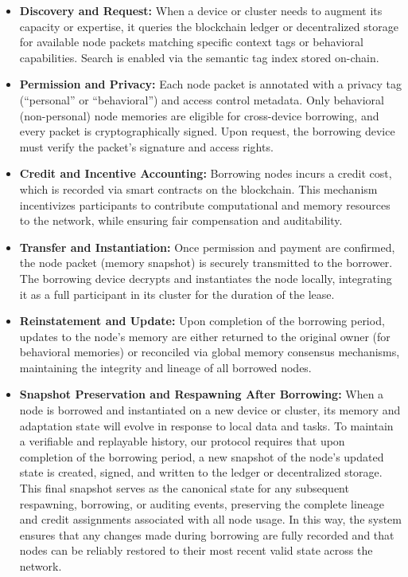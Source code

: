 \documentclass[11pt]{article}
\begin{document}
\begin{itemize}
    \item \textbf{Discovery and Request:} When a device or cluster needs to augment its capacity or expertise, it queries the blockchain ledger or decentralized storage for available node packets matching specific context tags or behavioral capabilities. Search is enabled via the semantic tag index stored on-chain.
    
    \item \textbf{Permission and Privacy:} Each node packet is annotated with a privacy tag (“personal” or “behavioral”) and access control metadata. Only behavioral (non-personal) node memories are eligible for cross-device borrowing, and every packet is cryptographically signed. Upon request, the borrowing device must verify the packet’s signature and access rights.
    
    \item \textbf{Credit and Incentive Accounting:} Borrowing nodes incurs a credit cost, which is recorded via smart contracts on the blockchain. This mechanism incentivizes participants to contribute computational and memory resources to the network, while ensuring fair compensation and auditability.
    
    \item \textbf{Transfer and Instantiation:} Once permission and payment are confirmed, the node packet (memory snapshot) is securely transmitted to the borrower. The borrowing device decrypts and instantiates the node locally, integrating it as a full participant in its cluster for the duration of the lease.
    
    \item \textbf{Reinstatement and Update:} Upon completion of the borrowing period, updates to the node’s memory are either returned to the original owner (for behavioral memories) or reconciled via global memory consensus mechanisms, maintaining the integrity and lineage of all borrowed nodes.

    \item \textbf{Snapshot Preservation and Respawning After Borrowing:}
    When a node is borrowed and instantiated on a new device or cluster, its memory and adaptation state will evolve in response to local data and tasks. To maintain a verifiable and replayable history, our protocol requires that upon completion of the borrowing period, a new snapshot of the node's updated state is created, signed, and written to the ledger or decentralized storage. This final snapshot serves as the canonical state for any subsequent respawning, borrowing, or auditing events, preserving the complete lineage and credit assignments associated with all node usage. In this way, the system ensures that any changes made during borrowing are fully recorded and that nodes can be reliably restored to their most recent valid state across the network.
\end{itemize}
\end{document}
